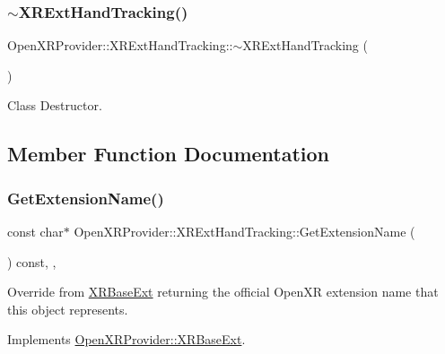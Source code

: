 \subsubsection{\texorpdfstring{$\sim$XRExtHandTracking()}{~XRExtHandTracking()}}
{\footnotesize\ttfamily Open\+X\+R\+Provider\+::\+X\+R\+Ext\+Hand\+Tracking\+::$\sim$\+X\+R\+Ext\+Hand\+Tracking (\begin{DoxyParamCaption}{ }\end{DoxyParamCaption})}



Class Destructor. 



\subsection{Member Function Documentation}
\mbox{\label{class_open_x_r_provider_1_1_x_r_ext_hand_tracking_a8706a0fc581e47e3b15fd6b58c9d5266}} 
\subsubsection{\texorpdfstring{GetExtensionName()}{GetExtensionName()}}
{\footnotesize\ttfamily const char$\ast$ Open\+X\+R\+Provider\+::\+X\+R\+Ext\+Hand\+Tracking\+::\+Get\+Extension\+Name (\begin{DoxyParamCaption}{ }\end{DoxyParamCaption}) const\hspace{0.3cm}{\ttfamily [inline]}, {\ttfamily [override]}, {\ttfamily [virtual]}}



Override from \mbox{\hyperlink{class_open_x_r_provider_1_1_x_r_base_ext}{X\+R\+Base\+Ext}} returning the official Open\+XR extension name that this object represents. 



Implements \mbox{\hyperlink{class_open_x_r_provider_1_1_x_r_base_ext_af23385b0dc226b0c4533a796ddc37352}{Open\+X\+R\+Provider\+::\+X\+R\+Base\+Ext}}.

\mbox{\label{class_open_x_r_provider_1_1_x_r_ext_hand_tracking_aaa8a634f50dd27d3ef1b3c85b558a6c1}} 
